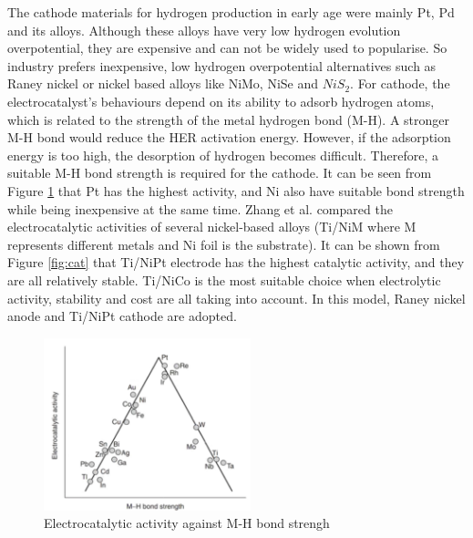 The cathode materials for hydrogen production in early age were mainly Pt, Pd and its alloys. Although these alloys have very low hydrogen evolution overpotential, they are expensive and can not be widely used to popularise.  So industry prefers inexpensive, low hydrogen overpotential alternatives such as Raney nickel or nickel based alloys like NiMo, NiSe and $NiS_2$. For cathode, the electrocatalyst's behaviours depend on its ability to adsorb hydrogen atoms, which is related to the strength of the metal hydrogen bond (M-H). \cite{cathode2}A stronger M-H bond would reduce the HER activation energy. However, if the adsorption energy is too high, the desorption of hydrogen becomes difficult. Therefore, a suitable M-H bond strength is required for the cathode. It can be seen from Figure \ref{fig:ca} that Pt has the highest activity, and Ni also have suitable bond strength while being inexpensive at the same time.  Zhang et al.\cite{cathode} compared the electrocatalytic activities of several nickel-based alloys (Ti/NiM where M represents different metals and Ni foil is the substrate). It can be shown from Figure \ref{fig:cat} that Ti/NiPt electrode has the highest catalytic activity, and they are all relatively stable. Ti/NiCo is the most suitable choice when electrolytic activity, stability and cost are all taking into account. In this model, Raney nickel anode and Ti/NiPt cathode are adopted.
\begin{figure}[H] 
\centering
\includegraphics[width=6cm]{catalyst.png}
\caption{Electrocatalytic activity against M-H bond strengh\cite{cathode2}}
\label{fig:ca}
\end{figure}
 
